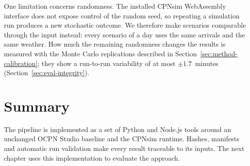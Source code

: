 One limitation concerns randomness. The installed CPNsim WebAssembly interface does not expose control of the random seed, so repeating a simulation run produces a new stochastic outcome. We therefore make scenarios comparable through the input instead: every scenario of a day uses the same arrivals and the same weather. How much the remaining randomness changes the results is measured with the Monte Carlo replications described in Section~\ref{sec:method-calibration}; they show a run-to-run variability of at most $\pm1.7$~minutes (Section~\ref{sec:eval-integrity}).

\section{Summary}

The pipeline is implemented as a set of Python and Node.js tools around an unchanged OCPN Studio baseline and the CPNsim runtime. Hashes, manifests and automatic run validation make every result traceable to its inputs. The next chapter uses this implementation to evaluate the approach.
